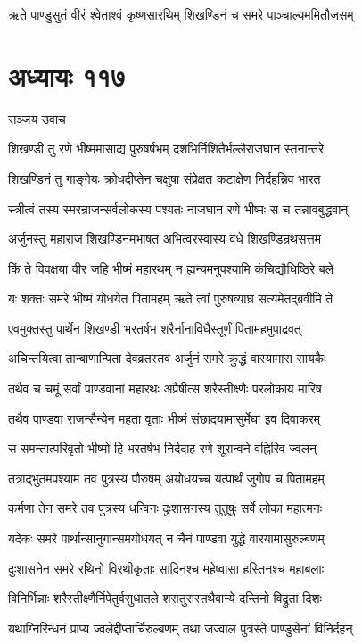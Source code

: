 \twolineshloka
{ऋते पाण्डुसुतं वीरं श्वेताश्वं कृष्णसारथिम्}
{शिखण्डिनं च समरे पाञ्चाल्यममितौजसम्}


\chapter{अध्यायः ११७}
\twolineshloka
{सञ्जय उवाच}
{}


\twolineshloka
{शिखण्डी तु रणे भीष्ममासाद्य पुरुषर्षभम्}
{दशभिर्निशितैर्भल्लैराजघान स्तनान्तरे}


\twolineshloka
{शिखण्डिनं तु गाङ्गेयः क्रोधदीप्तेन चक्षुषा}
{संप्रेक्षत कटाक्षेण निर्दहन्निव भारत}


\twolineshloka
{स्त्रीत्वं तस्य स्मरन्राजन्सर्वलोकस्य पश्यतः}
{नाजघान रणे भीष्मः स च तन्नावबुद्धवान्}


\twolineshloka
{अर्जुनस्तु महाराज शिखण्डिनमभाषत}
{अभित्वरस्वास्य वधे शिखण्डिन्रथसत्तम}


\twolineshloka
{किं ते विवक्षया वीर जहि भीष्मं महारथम्}
{न ह्यन्यमनुपश्यामि कंचिद्यौधिष्ठिरे बले}


\twolineshloka
{यः शक्तः समरे भीष्मं योधयेत पितामहम्}
{ऋते त्वां पुरुषव्याघ्र सत्यमेतद्ब्रवीमि ते}


\twolineshloka
{एवमुक्तस्तु पार्थेन शिखण्डी भरतर्षभ}
{शरैर्नानाविधैस्तूर्णं पितामहमुपाद्रवत्}


\twolineshloka
{अचिन्तयित्वा तान्बाणान्पिता देवव्रतस्तव}
{अर्जुनं समरे क्रुद्धं वारयामास सायकैः}


\twolineshloka
{तथैव च चमूं सर्वां पाण्डवानां महारथः}
{अप्रैषीत्स शरैस्तीक्ष्णैः परलोकाय मारिष}


\twolineshloka
{तथैव पाण्डवा राजन्सैन्येन महता वृताः}
{भीष्मं संछादयामासुर्मेघा इव दिवाकरम्}


\twolineshloka
{स समन्तात्परिवृतो भीष्मो हि भरतर्षभ}
{निर्ददाह रणे शूरान्वने वह्निरिव ज्वलन्}


\twolineshloka
{तत्राद्भुतमपश्याम तव पुत्रस्य पौरुषम्}
{अयोधयच्च यत्पार्थं जुगोप च पितामहम्}


\twolineshloka
{कर्मणा तेन समरे तव पुत्रस्य धन्विनः}
{दुःशासनस्य तुतुषुः सर्वे लोका महात्मनः}


\twolineshloka
{यदेकः समरे पार्थान्सानुगान्समयोधयत्}
{न चैनं पाण्डवा युद्धे वारयामासुरुल्बणम्}


\twolineshloka
{दुःशासनेन समरे रथिनो विरथीकृताः}
{सादिनश्च महेष्वासा हस्तिनश्च महाबलाः}


\twolineshloka
{विनिर्भिन्नाः शरैस्तीक्ष्णैर्निपेतुर्वसुधातले}
{शरातुरास्तथैवान्ये दन्तिनो विद्रुता दिशः}


\twolineshloka
{यथाग्निरिन्धनं प्राप्य ज्वलेद्दीप्तार्चिरुल्बणम्}
{तथा जज्वाल पुत्रस्ते पाण्डुसेनां विनिर्दहन्}


